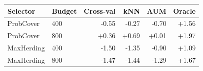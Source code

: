 \begin{tabular}{llrrrr}
\toprule
Selector & Budget & Cross-val & kNN & AUM & Oracle \\
\midrule
ProbCover & 400 & -0.55 & -0.27 & -0.70 & +1.56 \\
ProbCover & 800 & +0.36 & +0.69 & +0.01 & +1.97 \\
MaxHerding & 400 & -1.50 & -1.35 & -0.90 & +1.09 \\
MaxHerding & 800 & -1.47 & -1.44 & -1.29 & +1.67 \\
\bottomrule
\end{tabular}
